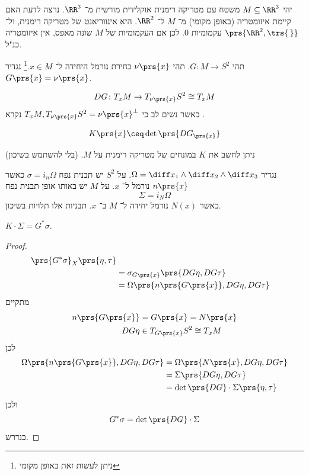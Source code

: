 \documentclass[a4paper,10pt,twoside,openany]{book}
\begin{document}
\begin{example}
יהי
$M \subseteq \RR^3$
משטח עם מטריקה רימנית אוקלידית מורשית מ־%
$\RR^3$.
נרצה לדעת האם קיימת איזומטריה (באופן מקומי) מ־%
$M$
ל־%
$\RR^2$.
היא אינווריאנט של מטריקה רימנית, ול־%
$\prs{\RR^2, \trs{\,}}$
עקמומיות
$0$.
לכן אם העקמומיות של
$M$
שונה מאפס, אין איזומטריה כנ"ל.

\begin{definition}
תהי
$G \colon M \to S^2$.
תהי
$\nu\prs{x}$
בחירת נורמל היחידה ל־%
$x \in M$.\footnote{ניתן לעשות זאת באופן מקומי}
נגדיר
$G\prs{x} = \nu\prs{x}$.
\end{definition}
\begin{definition}
\[DG \colon T_x M \to T_{\nu\prs{x}}S^2 \cong T_x M\]
כאשר נשים לב כי
$T_x M, T_{\nu\prs{x}}S^2 = \nu\prs{x}^{\perp}$
נקרא
.
\end{definition}

\begin{definition}
\[K\prs{x} \ceq \det\prs{DG_{\prs{x}}}\]
\end{definition}

\begin{theorem}[Eggregium]
ניתן לחשב את
$K$
במונחים של מטריקה רימנית על
$M$.
(בלי להשתמש בשיכון)
\end{theorem}
\end{example}

נגדיר
$\Omega = \diff x_1 \wedge \diff x_2 \wedge \diff x_3$.
על
$S^2$
יש תבנית נפח
$\sigma = i_n \Omega$
כאשר
$n\prs{x}$
נורמל ל־%
$x$.
על
$M$
יש באותו אופן תבנית נפח
\[\Sigma = i_N\Omega\]
כאשר
$N(x)$
נורמל יחידה ל־%
$M$
ב־%
$x$.
תבניות אלו תלויות בשיכון.

\begin{proposition}
$K \cdot \Sigma = G^* \sigma$.
\end{proposition}
\begin{proof}
\begin{align*}
\prs{G^* \sigma}_X \prs{\eta, \tau} \\&= \sigma_{G\prs{x}} \prs{DG \eta, DG\tau} \\&= \Omega\prs{n\prs{G\prs{x}}, DG\eta, DG\tau}
\end{align*}
מתקיים
\begin{align*}
n\prs{G\prs{x}} &= G\prs{x} = N\prs{x} \\
DG\eta &\in T_{G\prs{x}}S^2 \cong T_x M
\end{align*}
לכן
\begin{align*}
\Omega\prs{n\prs{G\prs{x}}, DG\eta, DG\tau} &= \Omega\prs{N\prs{x}, DG\eta, DG\tau} \\&= \Sigma\prs{DG\eta, DG\tau} \\&= \det\prs{DG} \cdot \Sigma\prs{\eta,\tau}
\end{align*}
ולכן
\[G^* \sigma = \det\prs{DG} \cdot \Sigma\]
כנדרש.
\end{proof}
\end{document}

